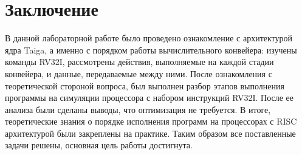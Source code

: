\chapter*{Заключение}
В данной лабораторной работе было проведено ознакомление с архитектурой ядра Taiga, а именно с порядком работы вычислительного конвейера: изучены команды RV32I, рассмотрены действия, выполняемые на каждой стадии конвейера, и данные, передаваемые между ними.
После ознакомления с теоретической стороной вопроса, был выполнен разбор этапов выполнения программы на симуляции процессора с набором инструкций RV32I. После ее анализа были сделаны выводы, что оптимизация не требуется.
В итоге, теоретические знания о порядке исполнения программ на процессорах с RISC архитектурой были закреплены на практике.
Таким образом все поставленные задачи решены, основная цель работы достигнута.